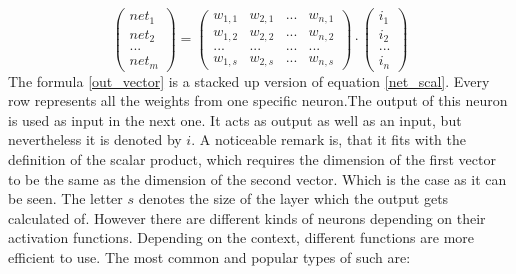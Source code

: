 \documentclass[12pt]{article}
\begin{document}
\begin{equation}
    \begin{pmatrix}net_{1}\\ net_{2}\\ ...\\ net_{m}\end{pmatrix} =\begin{pmatrix}
w_{1, 1} & w_{2, 1}  & ... &w_{n,1} \\ 
w_{1, 2} & w_{2, 2} & ... & w_{n,2} \\ 
... & ... &  ... & ...\\ 
w_{1,s} & w_{2, s} & ...  & w_{n, s}
\end{pmatrix} \cdot \begin{pmatrix}
i_{1}\\ 
i_{2}\\ 
...\\
i_{n}
\end{pmatrix}
\label{out_vector}
\end{equation}
The formula \ref{out_vector} is a stacked up version of equation \ref{net_scal}. Every row represents all the \glspl{weight} from one specific neuron.The output of this \gls{neuron} is used as  \gls{input} in the next one. It acts as output as well as an  \gls{input}, but nevertheless it is denoted by $i$. A noticeable remark is, that it fits with the definition of the \gls{scalar product}, which requires the dimension of the first \gls{vector} to be the same as the dimension of the second \gls{vector}. Which is the case as it can be seen. The letter $s$ denotes the \gls{size} of the layer which the output gets calculated of.
However there are different kinds of \glspl{neuron} depending on their  \glspl{activation function}. Depending on the context, different functions are more efficient to use. The most common and popular types of such are:  \cite{neuronal_network}
\end{document}

